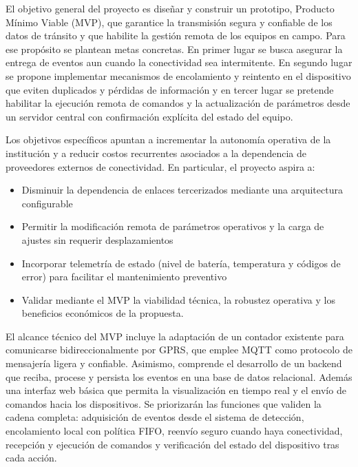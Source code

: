 El objetivo general del proyecto es diseñar y construir un prototipo, Producto Mínimo Viable (MVP), que garantice la transmisión segura y confiable de los datos de tránsito y que habilite la gestión remota de los equipos en campo. Para ese propósito se plantean metas concretas. 
En primer lugar se busca asegurar la entrega de eventos aun cuando la conectividad sea intermitente. En segundo lugar se propone implementar mecanismos de encolamiento y reintento en el dispositivo que eviten duplicados y pérdidas de información y en tercer lugar se pretende habilitar la ejecución remota de comandos y la actualización de parámetros desde un servidor central con confirmación explícita del estado del equipo.

Los objetivos específicos apuntan a incrementar la autonomía operativa de la institución y a reducir costos recurrentes asociados a la dependencia de proveedores externos de conectividad. En particular, el proyecto aspira a: 
\begin{itemize}
\item Disminuir la dependencia de enlaces tercerizados mediante una arquitectura configurable

\item Permitir la modificación remota de parámetros operativos y la carga de ajustes sin requerir desplazamientos 

\item Incorporar telemetría de estado (nivel de batería, temperatura y códigos de error) para facilitar el mantenimiento preventivo

\item Validar mediante el MVP la viabilidad técnica, la robustez operativa y los beneficios económicos de la propuesta.
\end{itemize}

El alcance técnico del MVP incluye la adaptación de un contador existente para comunicarse bidireccionalmente por GPRS, que emplee MQTT como protocolo de mensajería ligera y confiable. Asimismo, comprende el desarrollo de un backend que reciba, procese y persista los eventos en una base de datos relacional. Además una interfaz web básica que permita la visualización en tiempo real y el envío de comandos hacia los dispositivos. Se priorizarán las funciones que validen la cadena completa: adquisición de eventos desde el sistema de detección, encolamiento local con política FIFO, reenvío seguro cuando haya conectividad, recepción y ejecución de comandos y verificación del estado del dispositivo tras cada acción.

